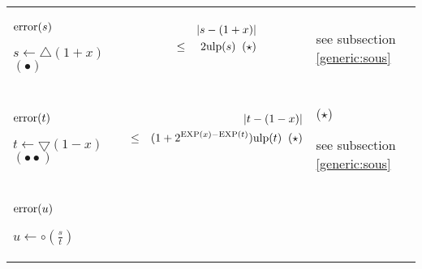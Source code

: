 \documentclass[12pt]{amsart}
\def\pinf{\bigtriangleup}
\def\minf{\bigtriangledown}
\def\ulp{{\rm ulp}}
\def\Exp{{\rm EXP}}
\begin{document}
\begin{center}
\begin{tabular}{l l l}

\begin{minipage}{2.5cm}
${\textnormal{error}}(s)$


$s \leftarrow \pinf(1+x) $
$(\bullet)$
\end{minipage} &
\begin{minipage}{7.5cm}

\begin{eqnarray}\nonumber
  &&|s-(1+x)| \\\nonumber
  &       \leq&  2 \ulp(s)\;\;(\star)\\\nonumber
\end{eqnarray}


\end{minipage} &
\begin{minipage}{6cm}

see subsection \ref{generic:sous}


\end{minipage}\\%
\begin{minipage}{2.5cm}
${\textnormal{error}}(t)$

$t \leftarrow \minf(1-x) $
$(\bullet\bullet)$
\end{minipage} &
\begin{minipage}{7.5cm}



\begin{eqnarray}\nonumber
  &&|t-(1-x)| \\\nonumber
  &       \leq&  (1+2^{\Exp(x)-\Exp(t)}) \ulp(t) \;\;(\star)\\\nonumber
\end{eqnarray}


\end{minipage} &
\begin{minipage}{6cm}

($\star$)

see subsection \ref{generic:sous}


\end{minipage}\\%
\begin{minipage}{2.5cm}
${\textnormal{error}}(u)$


$u \leftarrow \circ(\frac{s}{t}) $


\end{minipage} &
\begin{minipage}{7.5cm}


\end{minipage}
\end{tabular}
\end{center}
\end{document}
